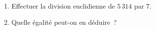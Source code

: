\documentclass[exercice]{thedocument}%
\begin{document}
%
\begin{enumerate}
    \item Effectuer la division euclidienne de $5\,314$ par $7$.
    \item Quelle égalité peut-on en déduire~?
\end{enumerate}
\end{document}
